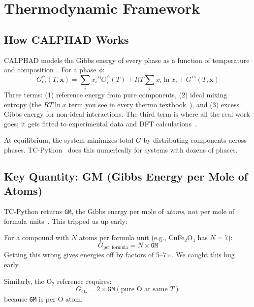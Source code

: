 \documentclass[11pt]{article}
\begin{document}
\section{Thermodynamic Framework}

\subsection{How CALPHAD Works}

CALPHAD models the Gibbs energy of every phase as a function of temperature and composition~\cite{Lukas2007, Hillert2007}. For a phase $\phi$:
\begin{equation}
    G_m^\phi(T, \mathbf{x}) = \sum_i x_i \,{}^0G_i^\phi(T) + RT \sum_i x_i \ln x_i + G^{\text{xs}}(T, \mathbf{x})
    \label{eq:calphad}
\end{equation}
Three terms: (1) reference energy from pure components, (2) ideal mixing entropy (the $RT\ln x$ term you see in every thermo textbook~\cite{Gaskell2024}), and (3) excess Gibbs energy for non-ideal interactions. The third term is where all the real work goes; it gets fitted to experimental data and DFT calculations~\cite{Lukas2007}.

At equilibrium, the system minimizes total $G$ by distributing components across phases. TC-Python~\cite{Andersson2002} does this numerically for systems with dozens of phases.

\subsection{Key Quantity: GM (Gibbs Energy per Mole of Atoms)}

TC-Python returns \texttt{GM}, the Gibbs energy per mole of \textit{atoms}, not per mole of formula units~\cite{Andersson2002}. This tripped us up early:

\begin{insight}[GM Normalization]
For a compound with $N$ atoms per formula unit (e.g., CuFe$_2$O$_4$ has $N = 7$):
\[
    G_{\text{per formula}} = N \times \texttt{GM}
\]
Getting this wrong gives energies off by factors of 5--7$\times$. We caught this bug early.
\end{insight}

Similarly, the O$_2$ reference requires:
\[
    G_{\text{O}_2} = 2 \times \texttt{GM}(\text{pure O at same }T)
\]
because \texttt{GM} is per O atom.
\end{document}

